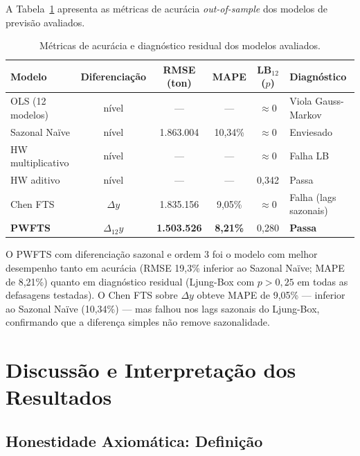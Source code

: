 \documentclass[
    12pt,
    oneside,
    openany,
    a4paper,
    english,
    brazil
]{abntex2}
\theoremstyle{definition}
\begin{document}
A Tabela~\ref{tab:accuracy} apresenta as métricas de acurácia \textit{out-of-sample} dos modelos de previsão avaliados.

\begin{table}[htb]
\centering
\caption{Métricas de acurácia e diagnóstico residual dos modelos avaliados.}
\label{tab:accuracy}
\begin{tabular}{l c c c c l}
\toprule
\textbf{Modelo} & \textbf{Diferenciação} & \textbf{RMSE (ton)} & \textbf{MAPE} & \textbf{LB$_{12}$ ($p$)} & \textbf{Diagnóstico} \\
\midrule
OLS (12 modelos)     & nível   & ---             & ---     & $\approx 0$  & Viola Gauss-Markov \\
Sazonal Naïve        & nível   & 1.863.004       & 10,34\% & $\approx 0$  & Enviesado \\
HW multiplicativo    & nível   & ---             & ---     & $\approx 0$  & Falha LB \\
HW aditivo           & nível   & ---             & ---     & 0,342        & Passa \\
Chen FTS             & $\Delta y$     & 1.835.156 & 9,05\%  & $\approx 0$  & Falha (lags sazonais) \\
\textbf{PWFTS}       & $\Delta_{12}y$ & \textbf{1.503.526} & \textbf{8,21\%} & 0,280 & \textbf{Passa} \\
\bottomrule
\end{tabular}
\end{table}

O PWFTS com diferenciação sazonal e ordem 3 foi o modelo com melhor desempenho tanto em acurácia (RMSE 19,3\% inferior ao Sazonal Naïve; MAPE de 8,21\%) quanto em diagnóstico residual (Ljung-Box com $p > 0{,}25$ em todas as defasagens testadas). O Chen FTS sobre $\Delta y$ obteve MAPE de 9,05\% --- inferior ao Sazonal Naïve (10,34\%) --- mas falhou nos lags sazonais do Ljung-Box, confirmando que a diferença simples não remove sazonalidade.

\chapter{Discussão e Interpretação dos Resultados}
\label{cap:discussao}

\section{Honestidade Axiomática: Definição}
\label{sec:definicao}
\end{document}
